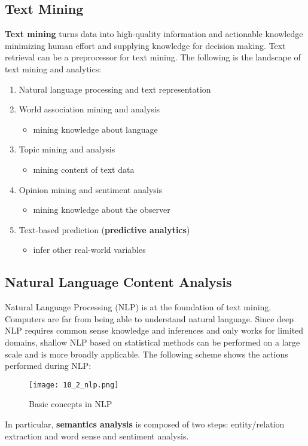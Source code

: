 \documentclass{article}
\begin{document}
\subsection{Text Mining}
\textbf{Text mining} turns data into high-quality information and actionable knowledge minimizing human effort and supplying knowledge for decision making. Text retrieval can be a preprocessor for text mining. The following is the landscape of text mining and analytics:
\begin{enumerate}
    \item Natural language processing and text representation
    \item World association mining and analysis
        \begin{itemize}
            \item mining knowledge about language
        \end{itemize}
    \item Topic mining and analysis
        \begin{itemize}
            \item mining content of text data
        \end{itemize}
    \item Opinion mining and sentiment analysis
        \begin{itemize}
            \item mining knowledge about the observer
        \end{itemize}
    \item Text-based prediction (\textbf{predictive analytics})
        \begin{itemize}
            \item infer other real-world variables 
        \end{itemize}
\end{enumerate}

\subsection{Natural Language Content Analysis}
Natural Language Processing (NLP) is at the foundation of text mining. Computers are far from being able to understand natural language. Since deep NLP requires common sense knowledge and inferences and only works for limited domains, shallow NLP based on statistical methods can be performed on a large scale and is more broadly applicable.
The following scheme shows the actions performed during NLP:
\begin{figure}[H]
    \centering
    \texttt{[image: 10\_2\_nlp.png]}
    \caption{Basic concepts in NLP}
\end{figure}
In particular, \textbf{semantics analysis} is composed of two steps: entity/relation extraction and word sense and sentiment analysis.
\end{document}
